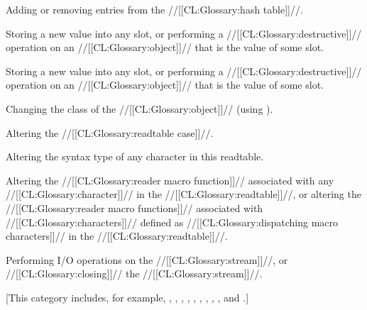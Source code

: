 Adding or removing entries from the //[[CL:Glossary:hash table]]//.




Storing a new value into any slot,
or performing a //[[CL:Glossary:destructive]]// operation on an //[[CL:Glossary:object]]// 
that is the value of some slot.





Storing a new value into any slot,
or performing a //[[CL:Glossary:destructive]]// operation on an //[[CL:Glossary:object]]// 
that is the value of some slot.

Changing the class of the //[[CL:Glossary:object]]// (\eg using ).








Altering the //[[CL:Glossary:readtable case]]//.

Altering the syntax type of any character in this readtable.

Altering the //[[CL:Glossary:reader macro function]]// associated with any //[[CL:Glossary:character]]//
in the //[[CL:Glossary:readtable]]//, or altering the //[[CL:Glossary:reader macro functions]]//
associated with //[[CL:Glossary:characters]]// defined as //[[CL:Glossary:dispatching macro characters]]//
in the //[[CL:Glossary:readtable]]//.




Performing I/O operations on the //[[CL:Glossary:stream]]//,
or //[[CL:Glossary:closing]]// the //[[CL:Glossary:stream]]//.


 [This category includes, for example, ,
                                      ,
                                      ,
                                      ,
                                      ,
                                      ,
                                      ,
                                      ,
                                      ,
                                  and .]






